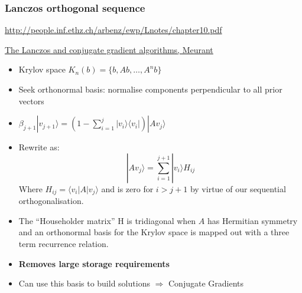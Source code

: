 \documentclass[pdf,ps,8pt]{beamer}
\newcommand{\link}[1]{\href{#1}{ {\color{blue} #1} }}
\begin{document}
  \begin{frame}[fragile]\small\frametitle{ Lanczos orthogonal sequence}

    \link{http://people.inf.ethz.ch/arbenz/ewp/Lnotes/chapter10.pdf}
    
    \href{https://www.researchgate.net/publication/232023768_The_Lanczos_and_conjugate_gradient_algorithms_in_finite_precision_arithmetic}
         {{\color{blue} The Lanczos and conjugate gradient algorithms, Meurant}}

    \begin{itemize}
      \item Krylov space $K_n(b) = \{ b, A b , \ldots , A^n b \}$
      \item Seek orthonormal basis: normalise components perpendicular to all prior vectors
      \item $\beta_{j+1}| v_{j+1} \rangle = (1 - \sum\limits_{i=1}^j |v_i\rangle \langle v_i | )|A v_j \rangle $
      \item Rewrite as:
        $$
        | A v_j \rangle =  \sum\limits_{i=1}^{j+1}  | v_i \rangle H_{ij}
        $$
        Where $H_{ij} = \langle v_i |A| v_j \rangle$ and is zero for $i>j+1$ by virtue of our sequential orthogonalisation.
      \item The ``Householder matrix'' H is tridiagonal when $A$ has Hermitian symmetry and an orthonormal basis for the Krylov space
             is mapped out with a three term recurrence relation.\\
      \item{ \bf Removes large storage requirements}
      \item Can use this basis to build solutions $\Rightarrow$ Conjugate Gradients
      \end{itemize}

  \end{frame}
\end{document}
